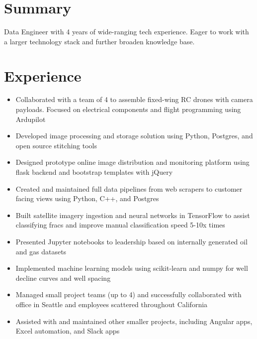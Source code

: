 \documentclass[10pt,a4paper,sans, dvipsnames]{moderncv}        %
\begin{document}
\makecvtitle

\section{Summary}

Data Engineer with 4 years of wide-ranging tech experience. Eager to work with a larger technology stack and further broaden knowledge base.


\section{Experience}
\begin{itemize}
\item Collaborated with a team of 4 to assemble fixed-wing RC drones with camera payloads. Focused on electrical components and flight programming using Ardupilot
\item Developed image processing and storage solution using Python, Postgres, and open source stitching tools
\item Designed prototype online image distribution and monitoring platform using flask backend and bootstrap templates with jQuery
\end{itemize}
\vspace{3mm}
\begin{itemize}
\item Created and maintained full data pipelines from web scrapers to customer facing views using Python, C++, and Postgres
\item Built satellite imagery ingestion and neural networks in TensorFlow to assist classifying fracs and improve manual classification speed 5-10x times
\item Presented Jupyter notebooks to leadership based on internally generated oil and gas datasets 
\item Implemented machine learning models using scikit-learn and numpy for well decline curves and well spacing
\item Managed small project teams (up to 4) and successfully collaborated with office in Seattle and employees scattered throughout California
\item Assisted with and maintained other smaller projects, including Angular apps, Excel automation, and Slack apps
\end{itemize}
\end{document}
